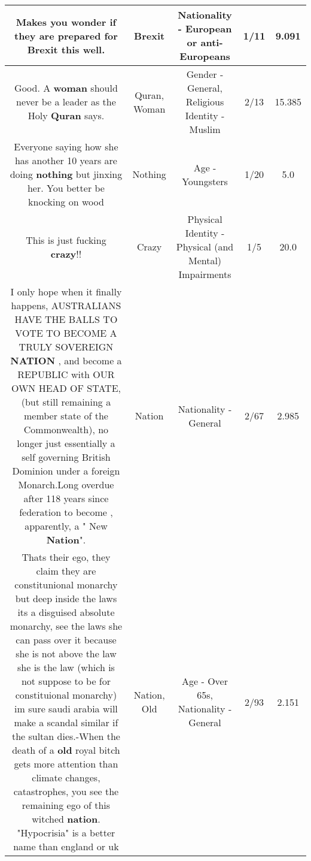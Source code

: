 \documentclass[11pt]{article}
\newlength\mylength
\begin{document}
\begin{center}
\begin{longtable}{|C{.65\mylength}|C{.30\mylength}|C{.12\mylength}|C{.12\mylength}|C{.12\mylength}|}
  \small Makes you wonder if they are prepared for \textbf{Brexit} this well.\normalsize   & Brexit & Nationality - European or anti-Europeans & 1/11 & 9.091 \\  \hline
  \small Good. A \textbf{woman} should never be a leader as the Holy \textbf{Quran} says.\normalsize   & Quran, Woman & Gender - General, Religious Identity - Muslim & 2/13 & 15.385 \\  \hline
  \small Everyone saying how she has another 10 years are doing \textbf{nothing} but jinxing her. You better be knocking on wood\normalsize   & Nothing & Age - Youngsters & 1/20 & 5.0 \\  \hline
  \small This is just fucking \textbf{crazy}!!\normalsize   & Crazy & Physical Identity - Physical (and Mental) Impairments & 1/5 & 20.0 \\  \hline
  \small I only hope when it finally happens,   AUSTRALIANS HAVE THE BALLS TO VOTE TO BECOME A TRULY SOVEREIGN \textbf{NATION} , and become a REPUBLIC with OUR OWN HEAD OF STATE, (but still remaining a member state of the Commonwealth),  no longer just essentially a self governing British Dominion under a foreign Monarch.Long overdue after 118 years since federation to become , apparently,  a " New \textbf{Nation}".\normalsize   & Nation & Nationality - General & 2/67 & 2.985 \\  \hline
  \small Thats their ego, they claim they are constitunional monarchy but deep inside the laws its a disguised absolute monarchy, see the laws she can pass over it because she is not above the law she is the law (which is not suppose to be for constituional monarchy) im sure saudi arabia will make a scandal similar if the sultan dies.-When the death of a \textbf{old} royal bitch gets more attention than climate changes, catastrophes, you see the remaining ego of this witched \textbf{nation}. "Hypocrisia" is a better name than england or uk\normalsize   & Nation, Old & Age - Over 65s, Nationality - General & 2/93 & 2.151 \\  \hline

\end{longtable}
\end{center}
\end{document}
